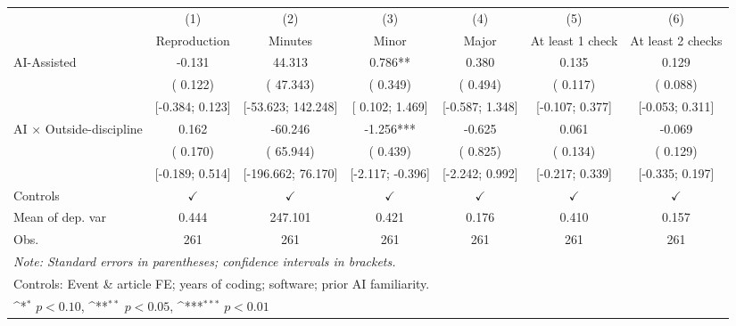 \def\sym#1{\ifmmode^{#1}\else\(^{#1}\)\fi}
\begin{tabular}{l*{6}{c}}
\hline\hline
 & (1) & (2) & (3) & (4) & (5) & (6)
\\
 & Reproduction & Minutes & Minor & Major & At least 1 check & At least 2 checks
 \\
\hline
AI-Assisted & -0.131 &  44.313 &  0.786** &  0.380 &  0.135 &  0.129
\\
 & ( 0.122) & ( 47.343) & ( 0.349) & ( 0.494) & ( 0.117) & ( 0.088)
\\
 & [-0.384;  0.123] & [-53.623;  142.248] & [ 0.102;  1.469] & [-0.587;  1.348] & [-0.107;  0.377] & [-0.053;  0.311]
\\
AI × Outside-discipline &  0.162 & -60.246 & -1.256*** & -0.625 &  0.061 & -0.069
\\
 & ( 0.170) & ( 65.944) & ( 0.439) & ( 0.825) & ( 0.134) & ( 0.129)
\\
 & [-0.189;  0.514] & [-196.662;  76.170] & [-2.117; -0.396] & [-2.242;  0.992] & [-0.217;  0.339] & [-0.335;  0.197]
\\
\hline
Controls & $\checkmark$ & $\checkmark$ & $\checkmark$ & $\checkmark$ & $\checkmark$ & $\checkmark$
\\
Mean of dep. var &  0.444 &  247.101 &  0.421 &  0.176 &  0.410 &  0.157
\\
Obs. & 261 & 261 & 261 & 261 & 261 & 261
\\
\hline
\hline\hline
\multicolumn{7}{l}{\it{Note:} Standard errors in parentheses; confidence intervals in brackets.}\\
\multicolumn{7}{l}{Controls: Event \& article FE; years of coding; software; prior AI familiarity.}\\
\multicolumn{7}{l}{\sym{*} $p<0.10$, \sym{**} $p<0.05$,  \sym{***} $p<0.01$}\\
\end{tabular}
